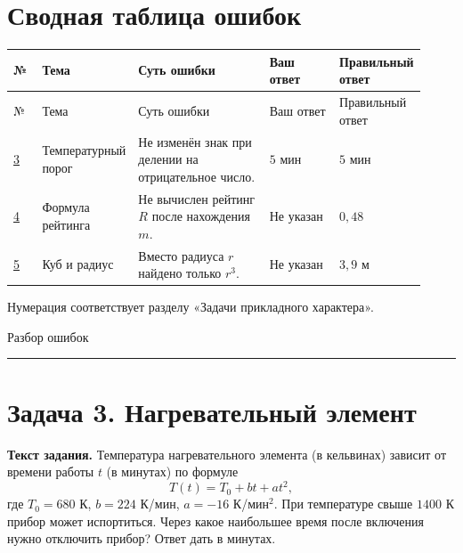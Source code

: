 \documentclass[12pt,a4paper]{article}
\newcommand{\ReviewField}[1]{{\color{ReviewTeal}\bfseries #1}\space}
\begin{document}
\section*{Сводная таблица ошибок}
\vspace{1em}
{\normalsize\setlength{\tabcolsep}{4pt}
\begin{longtable}{@{}>{\raggedright\arraybackslash}p{0.075\linewidth}>{\raggedright\arraybackslash}p{0.20\linewidth}>{\raggedright\arraybackslash}p{0.32\linewidth}>{\raggedright\arraybackslash}p{0.17\linewidth}>{\raggedright\arraybackslash}p{0.15\linewidth}@{}}
\toprule
\color{ReviewTeal}№ & \color{ReviewTeal}Тема & \color{ReviewTeal}Суть ошибки & \color{ReviewTeal}Ваш ответ & \color{ReviewTeal}Правильный ответ\\
\midrule
\endfirsthead
\toprule
\color{ReviewTeal}№ & \color{ReviewTeal}Тема & \color{ReviewTeal}Суть ошибки & \color{ReviewTeal}Ваш ответ & \color{ReviewTeal}Правильный ответ\\
\midrule
\endhead
\hyperref[task:applied3]{3} & Температурный порог & Не изменён знак при делении на отрицательное число. & $5$ мин & $5$ мин\\[5pt]
\hyperref[task:applied4]{4} & Формула рейтинга & Не вычислен рейтинг $R$ после нахождения $m$. & Не указан & $0{,}48$\\[5pt]
\hyperref[task:applied5]{5} & Куб и радиус & Вместо радиуса $r$ найдено только $r^3$. & Не указан & $3{,}9$ м\\
\bottomrule
\end{longtable}
}
\vspace{1em}
{\small\color{ReviewMuted}Нумерация соответствует разделу «Задачи прикладного характера».\par}
\newpage
\thispagestyle{fancy}
\vspace*{0.34\textheight}
\begin{center}
{\fontsize{24}{30}\selectfont\color{ReviewTeal}Разбор ошибок\par}
\vspace{7mm}
\rule{0.43\textwidth}{0.45pt}
\end{center}
\newpage
{}\label{task:applied3}
\section*{Задача 3. Нагревательный элемент}
\ReviewField{Текст задания.} Температура нагревательного элемента (в кельвинах) зависит от времени работы $t$ (в минутах) по формуле
\[
T(t)=T_0+bt+at^2,
\]
где $T_0=680$ К, $b=224$ К/мин, $a=-16$ К/мин$^2$. При температуре свыше $1400$ К прибор может испортиться. Через какое наибольшее время после включения нужно отключить прибор? Ответ дать в минутах.
\end{document}
